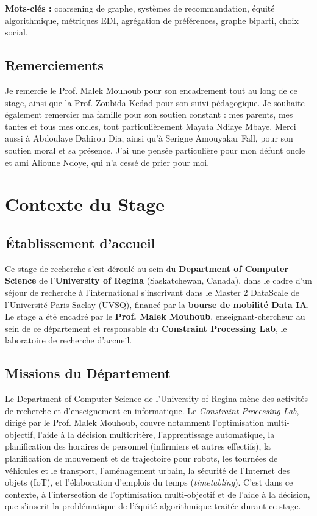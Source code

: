 \documentclass[12pt]{report}
\begin{document}
\bigskip
\noindent\textbf{Mots-clés :} coarsening de graphe, systèmes de
recommandation, équité algorithmique, métriques EDI, agrégation de
préférences, graphe biparti, choix social.

\section*{Remerciements}

Je remercie le Prof. Malek Mouhoub pour son encadrement tout au long de
ce stage, ainsi que la Prof. Zoubida Kedad pour son suivi pédagogique. Je
souhaite également remercier ma famille pour son soutien constant : mes
parents, mes tantes et tous mes oncles, tout particulièrement Mayata
Ndiaye Mbaye. Merci aussi à Abdoulaye Dahirou Dia, ainsi qu'à Serigne
Amouyakar Fall, pour son soutien moral et sa présence. J'ai une pensée
particulière pour mon défunt oncle et ami Alioune Ndoye, qui n'a cessé
de prier pour moi.

\chapter{Contexte du Stage}
\label{chap:contexte}

\section{Établissement d'accueil}

Ce stage de recherche s'est déroulé au sein du \textbf{Department of
Computer Science} de l'\textbf{University of Regina} (Saskatchewan,
Canada), dans le cadre d'un séjour de recherche à l'international
s'inscrivant dans le Master 2 DataScale de l'Université Paris-Saclay
(UVSQ), financé par la \textbf{bourse de mobilité Data IA}. Le stage a
été encadré par le \textbf{Prof. Malek Mouhoub}, enseignant-chercheur
au sein de ce département et responsable du \textbf{Constraint
Processing Lab}, le laboratoire de recherche d'accueil.

\section{Missions du Département}

Le Department of Computer Science de l'University of Regina mène des
activités de recherche et d'enseignement en informatique. Le
\emph{Constraint Processing Lab}, dirigé par le Prof. Malek Mouhoub,
couvre notamment l'optimisation multi-objectif, l'aide à la décision
multicritère, l'apprentissage automatique, la planification des
horaires de personnel (infirmiers et autres effectifs), la
planification de mouvement et de trajectoire pour robots, les tournées
de véhicules et le transport, l'aménagement urbain, la sécurité de
l'Internet des objets (IoT), et l'élaboration d'emplois du temps
(\emph{timetabling}). C'est dans ce contexte, à l'intersection de
l'optimisation multi-objectif et de l'aide à la décision, que
s'inscrit la problématique de l'équité algorithmique traitée durant ce
stage.
\end{document}

